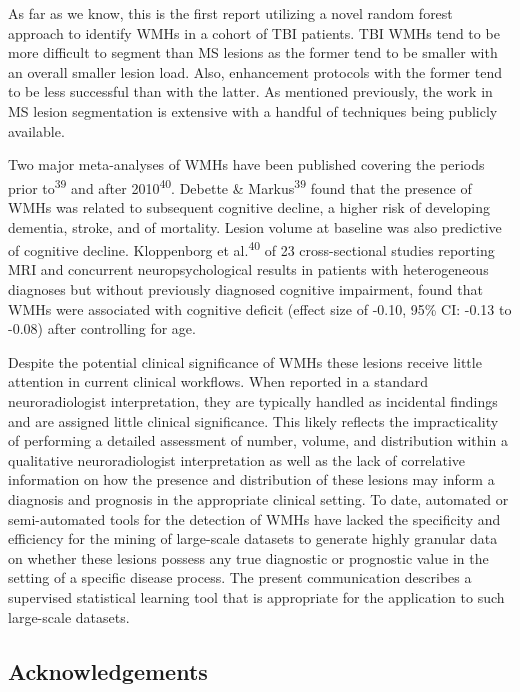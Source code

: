 \documentclass[11pt,]{article}
\begin{document}
As far as we know, this is the first report utilizing a novel random
forest approach to identify WMHs in a cohort of TBI patients. TBI WMHs
tend to be more difficult to segment than MS lesions as the former tend
to be smaller with an overall smaller lesion load. Also, enhancement
protocols with the former tend to be less successful than with the
latter. As mentioned previously, the work in MS lesion segmentation is
extensive with a handful of techniques being publicly available.

Two major meta-analyses of WMHs have been published covering the periods
prior to\textsuperscript{39} and after 2010\textsuperscript{40}. Debette
\& Markus\textsuperscript{39} found that the presence of WMHs was
related to subsequent cognitive decline, a higher risk of developing
dementia, stroke, and of mortality. Lesion volume at baseline was also
predictive of cognitive decline. Kloppenborg et al.\textsuperscript{40}
of 23 cross-sectional studies reporting MRI and concurrent
neuropsychological results in patients with heterogeneous diagnoses but
without previously diagnosed cognitive impairment, found that WMHs were
associated with cognitive deficit (effect size of -0.10, 95\% CI: -0.13
to -0.08) after controlling for age.

Despite the potential clinical significance of WMHs these lesions
receive little attention in current clinical workflows. When reported in
a standard neuroradiologist interpretation, they are typically handled
as incidental findings and are assigned little clinical significance.
This likely reflects the impracticality of performing a detailed
assessment of number, volume, and distribution within a qualitative
neuroradiologist interpretation as well as the lack of correlative
information on how the presence and distribution of these lesions may
inform a diagnosis and prognosis in the appropriate clinical setting. To
date, automated or semi-automated tools for the detection of WMHs have
lacked the specificity and efficiency for the mining of large-scale
datasets to generate highly granular data on whether these lesions
possess any true diagnostic or prognostic value in the setting of a
specific disease process. The present communication describes a
supervised statistical learning tool that is appropriate for the
application to such large-scale datasets.

\clearpage

\subsection{Acknowledgements}\label{acknowledgements}
\end{document}
